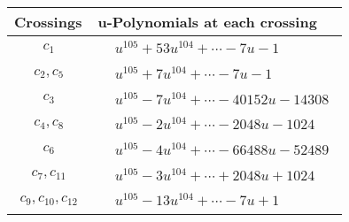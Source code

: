 \documentclass[1p]{elsarticle_modified}
\theoremstyle{definition}
\begin{document}
\begin{tabular}{m{50pt}|m{274pt}}
Crossings & \hspace{64pt}u-Polynomials at each crossing \\
\hline $$\begin{aligned}c_{1}\end{aligned}$$&$\begin{aligned}
&u^{105}+53 u^{104}+\cdots-7 u-1
\end{aligned}$\\
\hline $$\begin{aligned}c_{2},c_{5}\end{aligned}$$&$\begin{aligned}
&u^{105}+7 u^{104}+\cdots-7 u-1
\end{aligned}$\\
\hline $$\begin{aligned}c_{3}\end{aligned}$$&$\begin{aligned}
&u^{105}-7 u^{104}+\cdots-40152 u-14308
\end{aligned}$\\
\hline $$\begin{aligned}c_{4},c_{8}\end{aligned}$$&$\begin{aligned}
&u^{105}-2 u^{104}+\cdots-2048 u-1024
\end{aligned}$\\
\hline $$\begin{aligned}c_{6}\end{aligned}$$&$\begin{aligned}
&u^{105}-4 u^{104}+\cdots-66488 u-52489
\end{aligned}$\\
\hline $$\begin{aligned}c_{7},c_{11}\end{aligned}$$&$\begin{aligned}
&u^{105}-3 u^{104}+\cdots+2048 u+1024
\end{aligned}$\\
\hline $$\begin{aligned}c_{9},c_{10},c_{12}\end{aligned}$$&$\begin{aligned}
&u^{105}-13 u^{104}+\cdots-7 u+1
\end{aligned}$\\
\hline
\end{tabular}\\~\\
\newpage\renewcommand{\arraystretch}{1}
\end{document}
